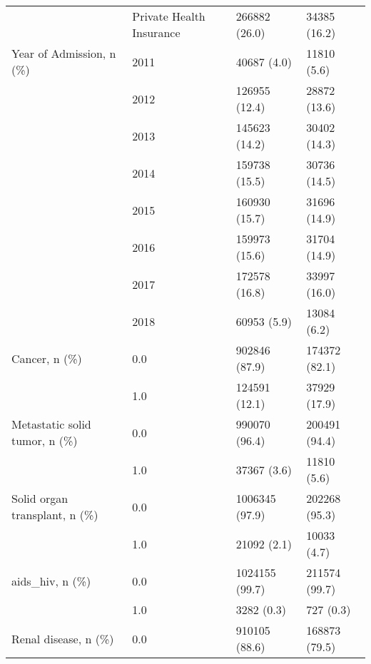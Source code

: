 \begin{tabular}{llll}
                                       & Private Health Insurance &                         266882 (26.0) &      34385 (16.2) \\
Year of Admission, n (\%) & 2011 &                           40687 (4.0) &       11810 (5.6) \\
                                       & 2012 &                         126955 (12.4) &      28872 (13.6) \\
                                       & 2013 &                         145623 (14.2) &      30402 (14.3) \\
                                       & 2014 &                         159738 (15.5) &      30736 (14.5) \\
                                       & 2015 &                         160930 (15.7) &      31696 (14.9) \\
                                       & 2016 &                         159973 (15.6) &      31704 (14.9) \\
                                       & 2017 &                         172578 (16.8) &      33997 (16.0) \\
                                       & 2018 &                           60953 (5.9) &       13084 (6.2) \\
Cancer, n (\%) & 0.0 &                         902846 (87.9) &     174372 (82.1) \\
                                       & 1.0 &                         124591 (12.1) &      37929 (17.9) \\
Metastatic solid tumor, n (\%) & 0.0 &                         990070 (96.4) &     200491 (94.4) \\
                                       & 1.0 &                           37367 (3.6) &       11810 (5.6) \\
Solid organ transplant, n (\%) & 0.0 &                        1006345 (97.9) &     202268 (95.3) \\
                                       & 1.0 &                           21092 (2.1) &       10033 (4.7) \\
aids\_hiv, n (\%) & 0.0 &                        1024155 (99.7) &     211574 (99.7) \\
                                       & 1.0 &                            3282 (0.3) &         727 (0.3) \\
Renal disease, n (\%) & 0.0 &                         910105 (88.6) &     168873 (79.5) \\

\end{tabular}
